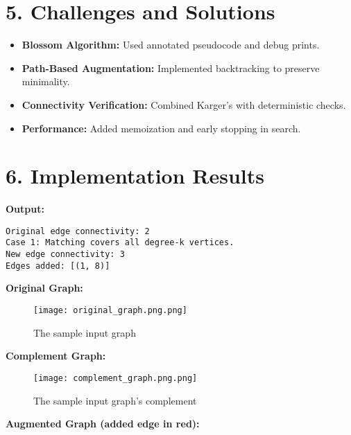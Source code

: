 \documentclass[11pt]{article}
\begin{document}
\section*{5. Challenges and Solutions}
\begin{itemize}
  \item \textbf{Blossom Algorithm:} Used annotated pseudocode and debug prints.
  \item \textbf{Path-Based Augmentation:} Implemented backtracking to preserve minimality.
  \item \textbf{Connectivity Verification:} Combined Karger’s with deterministic checks.
  \item \textbf{Performance:} Added memoization and early stopping in search.
\end{itemize}

\section*{6. Implementation Results}
\textbf{Output:}
\begin{verbatim}
Original edge connectivity: 2
Case 1: Matching covers all degree-k vertices.
New edge connectivity: 3
Edges added: [(1, 8)]
\end{verbatim}

\noindent\textbf{Original Graph:}

\begin{figure}[h!]
    \centering
    \begin{minipage}{0.6\textwidth}
        \centering
        \texttt{[image: original\_graph.png.png]}
        \caption{The sample input graph}
        \label{fig:graph}
    \end{minipage}
\end{figure}

\noindent\textbf{Complement Graph:}

\begin{figure}[h!]
    \centering
    \begin{minipage}{0.6\textwidth}
        \centering
        \texttt{[image: complement\_graph.png.png]}
        \caption{The sample input graph's complement}
        \label{fig:graph}
    \end{minipage}
\end{figure}

\noindent\textbf{Augmented Graph (added edge in red):}
\end{document}
